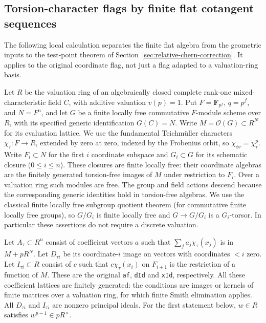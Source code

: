 \subsection{Torsion-character flags by finite flat cotangent sequences}
\label{sec:geometry-torsion-character-flags}
The following local calculation separates the finite flat algebra from
the geometric inputs to the test-point theorem of
Section~\ref{sec:relative-chern-correction}.
It applies to the original coordinate flag, not just a flag adapted to
a valuation-ring basis.

Let \(R\) be the valuation ring of an algebraically closed complete
rank-one mixed-characteristic field \(C\), with additive valuation
\(v(p)=1\). Put \(F=\mathbf F_{p^f}\), \(q=p^f\), and
\(N=F^n\), and let \(G\) be a finite locally free commutative
\(F\)-module scheme over \(R\), with its specified generic
identification \(G(C)=N\). Write \(M=\mathcal O(G)\subset R^N\)
for its evaluation lattice. We use the fundamental Teichm\"uller
characters \(\chi_\tau:F\to R\), extended by zero at zero, indexed
by the Frobenius orbit, so
\(\chi_{\phi\tau}=\chi_\tau^p\).
Write \(F_i\subset N\) for the first \(i\) coordinate subspace and
\(G_i\subset G\) for its schematic closure (\(0\le i\le n\)).
These closures are finite locally free: their coordinate algebras
are the finitely generated torsion-free images of \(M\) under
restriction to \(F_i\). Over a valuation ring such modules are free.
The group and field actions descend because the corresponding
generic identities hold in torsion-free algebras.
We use the classical finite locally free subgroup quotient theorem
(for commutative finite locally free groups), so \(G/G_i\) is
finite locally free and \(G\to G/G_i\) is a \(G_i\)-torsor.
In particular these assertions do not require a discrete valuation.

Let \(A_\tau\subset R^n\) consist of coefficient vectors \(a\)
such that \(\sum_j a_j\chi_\tau(x_j)\) is in \(M+pR^N\).
Let \(D_{\tau i}\) be its coordinate-\(i\) image on vectors with
coordinates \(<i\) zero. Let \(I_{\tau i}\subset R\) consist of
\(c\) such that \(c\chi_\tau(x_i)\) on \(F_{i+1}\) is the
restriction of a function of \(M\). These are the original
\texttt{af}, \texttt{dId} and \texttt{xId}, respectively.
All these coefficient lattices are finitely generated: the
conditions are images or kernels of finite matrices over a
valuation ring, for which finite Smith elimination applies.
All \(D_{\tau i}\) and \(I_{\tau i}\) are nonzero principal ideals.
For the first statement below, \(w\in R\) satisfies
\(w^{p-1}\in pR^\times\).

